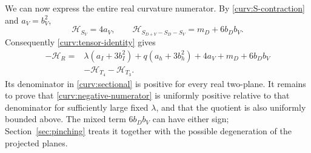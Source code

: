 We can now express the entire real curvature numerator.
By \eqref{curv:S-contraction} and $a_V=b_V^2$,
\[
 \mathcal H_{S_V}=4a_V,\qquad
 \mathcal H_{S_{D+V}-S_D-S_V}=m_D+6b_Db_V.
\]
Consequently \eqref{curv:tensor-identity} gives
\begin{equation}\label{curv:negative-numerator}
 \begin{aligned}
 -\mathcal H_R={}&\lambda(a_I+3b_I^2)+q(a_h+3b_h^2)
        +4a_V+m_D+6b_Db_V\\
       &-\mathcal H_{T_4}-\mathcal H_{T_3}.
 \end{aligned}
\end{equation}
Its denominator in \eqref{curv:sectional} is positive for every real
two-plane.  It remains to prove that
\eqref{curv:negative-numerator} is uniformly positive relative to
that denominator for sufficiently large fixed $\lambda$, and that
the quotient is also uniformly bounded above.  The mixed term
$6b_Db_V$ can have either sign; Section~\ref{sec:pinching} treats
it together with the possible degeneration of the projected planes.
